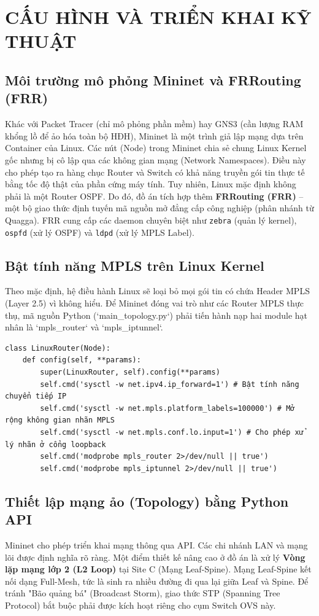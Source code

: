 \section{CẤU HÌNH VÀ TRIỂN KHAI KỸ THUẬT}

\subsection{Môi trường mô phỏng Mininet và FRRouting (FRR)}
Khác với Packet Tracer (chỉ mô phỏng phần mềm) hay GNS3 (cần lượng RAM khổng lồ để ảo hóa toàn bộ HĐH), Mininet là một trình giả lập mạng dựa trên Container của Linux. Các nút (Node) trong Mininet chia sẻ chung Linux Kernel gốc nhưng bị cô lập qua các không gian mạng (Network Namespaces). Điều này cho phép tạo ra hàng chục Router và Switch có khả năng truyền gói tin thực tế bằng tốc độ thật của phần cứng máy tính.
Tuy nhiên, Linux mặc định không phải là một Router OSPF. Do đó, đồ án tích hợp thêm \textbf{FRRouting (FRR)} – một bộ giao thức định tuyến mã nguồn mở đẳng cấp công nghiệp (phân nhánh từ Quagga). FRR cung cấp các daemon chuyên biệt như \texttt{zebra} (quản lý kernel), \texttt{ospfd} (xử lý OSPF) và \texttt{ldpd} (xử lý MPLS Label).

\subsection{Bật tính năng MPLS trên Linux Kernel}
Theo mặc định, hệ điều hành Linux sẽ loại bỏ mọi gói tin có chứa Header MPLS (Layer 2.5) vì không hiểu. Để Mininet đóng vai trò như các Router MPLS thực thụ, mã nguồn Python (`main\_topology.py`) phải tiến hành nạp hai module hạt nhân là `mpls\_router` và `mpls\_iptunnel`.

\begin{lstlisting}[style=powershell, caption={Code nạp module kernel MPLS và bật IPv4 Forwarding trong class LinuxRouter}]
class LinuxRouter(Node):
    def config(self, **params):
        super(LinuxRouter, self).config(**params)
        self.cmd('sysctl -w net.ipv4.ip_forward=1') # Bật tính năng chuyển tiếp IP
        self.cmd('sysctl -w net.mpls.platform_labels=100000') # Mở rộng không gian nhãn MPLS
        self.cmd('sysctl -w net.mpls.conf.lo.input=1') # Cho phép xử lý nhãn ở cổng loopback
        self.cmd('modprobe mpls_router 2>/dev/null || true')
        self.cmd('modprobe mpls_iptunnel 2>/dev/null || true')
\end{lstlisting}

\subsection{Thiết lập mạng ảo (Topology) bằng Python API}
Mininet cho phép triển khai mạng thông qua API. Các chi nhánh LAN và mạng lõi được định nghĩa rõ ràng. Một điểm thiết kế nâng cao ở đồ án là xử lý \textbf{Vòng lặp mạng lớp 2 (L2 Loop)} tại Site C (Mạng Leaf-Spine).
Mạng Leaf-Spine kết nối dạng Full-Mesh, tức là sinh ra nhiều đường đi qua lại giữa Leaf và Spine. Để tránh "Bão quảng bá" (Broadcast Storm), giao thức STP (Spanning Tree Protocol) bắt buộc phải được kích hoạt riêng cho cụm Switch OVS này.

